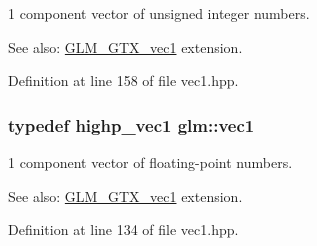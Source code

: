 1 component vector of unsigned integer numbers. \begin{Desc}
\item[See also:]\hyperlink{group__gtx__vec1}{GLM\_\-GTX\_\-vec1} extension. \end{Desc}


Definition at line 158 of file vec1.hpp.\hypertarget{namespaceglm_16030dae9029ed1eab1553a2183bbb79}{
\subsubsection[vec1]{\setlength{\rightskip}{0pt plus 5cm}typedef {\bf highp\_\-vec1} {\bf glm::vec1}}}
\label{namespaceglm_16030dae9029ed1eab1553a2183bbb79}


1 component vector of floating-point numbers. \begin{Desc}
\item[See also:]\hyperlink{group__gtx__vec1}{GLM\_\-GTX\_\-vec1} extension. \end{Desc}


Definition at line 134 of file vec1.hpp.